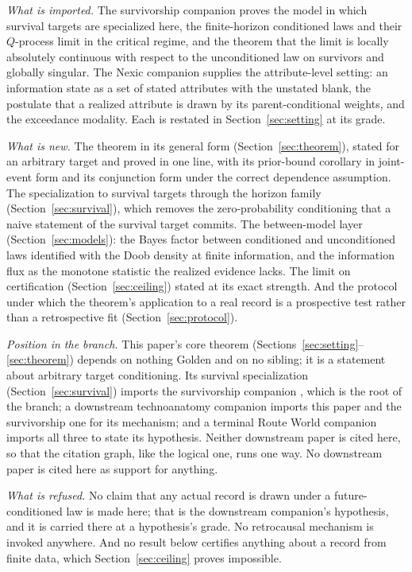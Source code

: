 \emph{What is imported.} The survivorship companion \cite{GoldenSurvivorship} proves
the model in which survival targets are specialized here, the
finite-horizon conditioned laws and their $Q$-process limit in the
critical regime, and the theorem that the limit is locally absolutely
continuous with respect to the unconditioned law on survivors and
globally singular. The Nexic companion \cite{Nexus} supplies the
attribute-level setting: an information state as a set of stated
attributes with the unstated blank, the postulate that a realized
attribute is drawn by its parent-conditional weights, and the exceedance
modality. Each is restated in Section~\ref{sec:setting} at its grade.

\emph{What is new.} The theorem in its general form
(Section~\ref{sec:theorem}), stated for an arbitrary target and proved
in one line, with its prior-bound corollary in joint-event form and its
conjunction form under the correct dependence assumption. The
specialization to survival targets through the horizon family
(Section~\ref{sec:survival}), which removes the zero-probability
conditioning that a naive statement of the survival target commits. The
between-model layer (Section~\ref{sec:models}): the Bayes factor between
conditioned and unconditioned laws identified with the Doob density at
finite information, and the information flux as the monotone statistic
the realized evidence lacks. The limit on certification
(Section~\ref{sec:ceiling}) stated at its exact strength. And the
protocol under which the theorem's application to a real record is a
prospective test rather than a retrospective fit
(Section~\ref{sec:protocol}).

\emph{Position in the branch.} This paper's core theorem
(Sections~\ref{sec:setting}--\ref{sec:theorem}) depends on nothing
Golden and on no sibling; it is a statement about arbitrary target
conditioning. Its survival specialization (Section~\ref{sec:survival})
imports the survivorship companion \cite{GoldenSurvivorship}, which is the root of
the branch; a downstream technoanatomy companion imports this paper and the
survivorship one for its mechanism; and a terminal Route World
companion imports all three to state its hypothesis. Neither downstream
paper is cited here, so that the citation graph, like the logical one,
runs one way. No downstream paper is cited here as support for
anything.

\emph{What is refused.} No claim that any actual record is drawn under a
future-conditioned law is made here; that is the downstream companion's
hypothesis, and it is carried there at a hypothesis's grade. No
retrocausal mechanism is invoked anywhere. And no result below certifies
anything about a record from finite data, which Section~\ref{sec:ceiling}
proves impossible.

